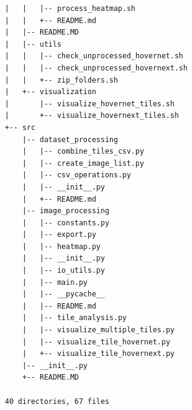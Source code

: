 \begin{small}
\begin{verbatim}
|   |   |-- process_heatmap.sh
|   |   +-- README.md
|   |-- README.MD
|   |-- utils
|   |   |-- check_unprocessed_hovernet.sh
|   |   |-- check_unprocessed_hovernext.sh
|   |   +-- zip_folders.sh
|   +-- visualization
|       |-- visualize_hovernet_tiles.sh
|       +-- visualize_hovernext_tiles.sh
+-- src
    |-- dataset_processing
    |   |-- combine_tiles_csv.py
    |   |-- create_image_list.py
    |   |-- csv_operations.py
    |   |-- __init__.py
    |   +-- README.md
    |-- image_processing
    |   |-- constants.py
    |   |-- export.py
    |   |-- heatmap.py
    |   |-- __init__.py
    |   |-- io_utils.py
    |   |-- main.py
    |   |-- __pycache__
    |   |-- README.md
    |   |-- tile_analysis.py
    |   |-- visualize_multiple_tiles.py
    |   |-- visualize_tile_hovernet.py
    |   +-- visualize_tile_hovernext.py
    |-- __init__.py
    +-- README.MD

40 directories, 67 files
\end{verbatim}
\end{small}


